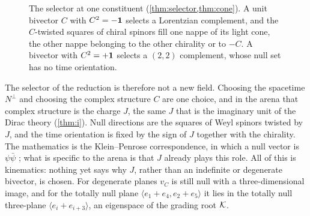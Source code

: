 \begin{figure}[t]
\centering
{}
\caption{The selector at one constituent (\cref{thm:selector,thm:cone}). A unit bivector $C$ with $C^2=-\mathbf 1$ selects a Lorentzian complement, and the $C$-twisted squares of
chiral spinors fill one nappe of its light cone, the other nappe belonging to the other chirality or to $-C$. A bivector with $C^2=+\mathbf 1$ selects a $(2,2)$ complement,
whose null set has no time orientation.}
\label{fig:selector}
\end{figure}

The selector of the reduction is therefore not a new field. Choosing the spacetime $N^\perp$ and choosing the complex structure $C$ are one choice, and in the arena that
complex structure is the charge $J$, the same $J$ that is the imaginary unit of the Dirac theory (\cref{thm:i}). Null directions are the squares of Weyl spinors twisted
by $J$, and the time orientation is fixed by the sign of $J$ together with the chirality. The mathematics is the Klein--Penrose correspondence, in which a null vector is
$\psi\bar\psi$ \cite{PenroseRindler84,WardWells}; what is specific to the arena is that $J$ already plays this role. All of this is kinematics: nothing yet says why $J$,
rather than an indefinite or degenerate bivector, is chosen. For degenerate planes $v_C$ is still null with a three-dimensional image, and for the totally null plane
$\langle e_1+e_4,e_2+e_5\rangle$ it lies in the totally null three-plane $\langle e_i+e_{i+3}\rangle$, an eigenspace of the grading root $\mathcal K$.

